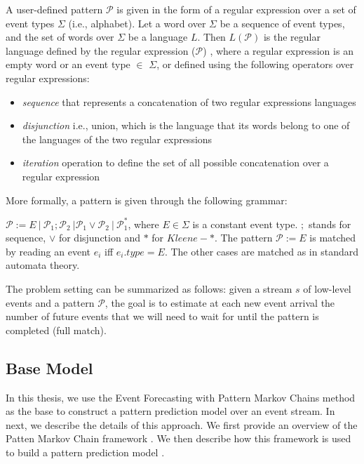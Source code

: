 \par A user-defined pattern $\mathcal{P}$ is given in the form of a regular expression over  a set of event types $\Sigma$ (i.e., alphabet). Let a word over $\Sigma$ be a sequence of event types, and the set of words over $\Sigma$ be a language  $L$. Then $L(\mathcal{P})$ is the regular language defined by the regular expression ($\mathcal{P}$) \cite{hopcroft2006automata,nuel_pattern_2008,alevizos2017event},  where a regular expression is an empty word or an event type $\in$ $\Sigma$, or  defined using the following operators over regular expressions:
\begin{itemize}[noitemsep]
	\item \textit{sequence} that represents a concatenation of two regular expressions languages 
	\item \textit{disjunction} i.e., union, which is the language that its words belong to one of the languages of the two regular expressions 
	\item \textit{iteration} operation to define the set of all possible concatenation over a regular expression
\end{itemize}

More formally, a pattern is given through the following grammar:
\begin{definition}
$\mathcal{P} := E\ |\ \mathcal{P}_{1} ; \mathcal{P}_{2}\ | \mathcal{P}_{1} \vee \mathcal{P}_{2}\ |\ \mathcal{P}_{1}^{*}  $, where $E \in \Sigma$ is a constant event type. $;$ stands for sequence, $\vee$ for disjunction and $*$ for $\mathit{Kleene}-*$.
The pattern $\mathcal{P} := E$ is matched by reading an event $e_i$ iff $e_{i}.type = E$.
The other cases are matched as in standard automata theory.
\end{definition}


The problem setting can be summarized as follows: given a stream $s$ of low-level events and a pattern $\mathcal{P}$, 
the goal is to estimate at each new event arrival the number of future events
that we will need to wait for until the pattern is completed (full match).

\subsection{Base Model}
\label{sec:Event-Forecasting-PMC}

\par In this thesis, we use the Event Forecasting with Pattern Markov Chains method \cite{alevizos2017event} as the base to construct a pattern prediction model over an event stream. In next, we describe the details of this approach. We first provide an overview of the Patten Markov Chain framework \cite{nuel_pattern_2008}. We then describe how this framework is used to build a pattern prediction model \cite{alevizos2017event}.  


